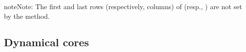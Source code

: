 \documentclass[letterpaper,10pt,english]{sphinxmanual}
\begin{document}
\begin{fulllineitems}
\begin{fulllineitems}
\begin{quote}
\begin{description}
\begin{itemize}
\end{itemize}


\end{description}\end{quote}

\begin{sphinxadmonition}{note}{Note:}
The first and last rows (respectively, columns) of  (resp., ) are not set by the method.
\end{sphinxadmonition}

\end{fulllineitems}


\end{fulllineitems}



\subsection{Dynamical cores}
\label{\detokenize{api:dynamical-cores}}
\end{document}
